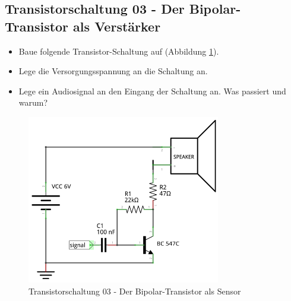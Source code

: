 
\subsection[Der Bipolar-Transistor als Verstärker]{Transistorschaltung 03 - Der Bipolar-Transistor als Verstärker}

\begin{itemize}
\itemsep1pt\parskip0pt
\item Baue folgende Transistor-Schaltung auf (Abbildung \ref{s03}). 
\item Lege die Versorgungsspannung an die Schaltung an.
\item Lege ein Audiosignal an den Eingang der Schaltung an. Was passiert und warum?
\end{itemize}

\begin{figure}[H]
	\centering
	\includegraphics[scale=1.6]{Transistor/Schaltungen/NPN_Verstaerker.pdf}
	\caption{Transistorschaltung 03 - Der Bipolar-Transistor als Sensor}
	\label{s03}
\end{figure}
